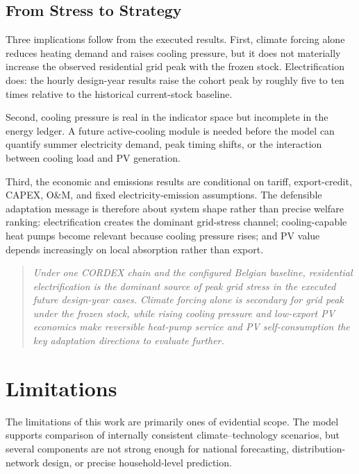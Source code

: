 \subsection{From Stress to Strategy}
\label{sec:adaptation_summary}

Three implications follow from the executed results. First, climate forcing alone reduces heating demand and raises cooling pressure, but it does not materially increase the observed residential grid peak with the frozen stock. Electrification does: the hourly design-year results raise the cohort peak by roughly five to ten times relative to the historical current-stock baseline.

Second, cooling pressure is real in the indicator space but incomplete in the energy ledger. A future active-cooling module is needed before the model can quantify summer electricity demand, peak timing shifts, or the interaction between cooling load and PV generation.

Third, the economic and emissions results are conditional on tariff, export-credit, CAPEX, O\&M, and fixed electricity-emission assumptions. The defensible adaptation message is therefore about system shape rather than precise welfare ranking: electrification creates the dominant grid-stress channel; cooling-capable heat pumps become relevant because cooling pressure rises; and PV value depends increasingly on local absorption rather than export.

\begin{quote}\itshape
Under one CORDEX chain and the configured Belgian baseline, residential electrification is the dominant source of peak grid stress in the executed future design-year cases. Climate forcing alone is secondary for grid peak under the frozen stock, while rising cooling pressure and low-export PV economics make reversible heat-pump service and PV self-consumption the key adaptation directions to evaluate further.
\end{quote}


\pagebreak
\section{Limitations}\label{sec:limitations}

The limitations of this work are primarily ones of evidential scope. The model
supports comparison of internally consistent climate--technology scenarios, but
several components are not strong enough for national forecasting,
distribution-network design, or precise household-level prediction.


